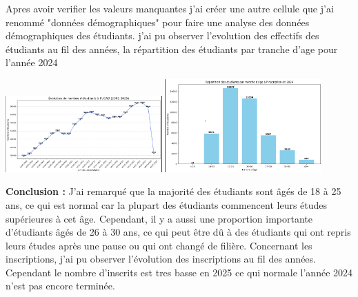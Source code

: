 Apres avoir verifier les valeurs manquantes j'ai créer une autre cellule que j'ai renommé "données démographiques"  pour faire une analyse des données démographiques des étudiants. 
j'ai pu observer l'evolution des effectifs des étudiants au fil des années, la répartition des étudiants par tranche d'age pour l'année 2024  
\begin{center}
    \centering
    \includegraphics[width=0.45\textwidth]{image/4.png}
    \hspace{0.05\textwidth}
    \includegraphics[width=0.45\textwidth]{image/5.png}
\end{center}

\textcolor{red}{\faInfoCircle}\textbf{Conclusion :}  J'ai remarqué que la majorité des étudiants sont âgés de 18 à 25 ans, ce qui est normal car la plupart des étudiants commencent leurs études supérieures à cet âge. Cependant, il y a aussi une proportion importante d'étudiants âgés de 26 à 30 ans, ce qui peut être dû à des étudiants qui ont repris leurs études après une pause ou qui ont changé de filière.
Concernant les inscriptions, j'ai pu observer l'évolution des inscriptions au fil des années. Cependant le nombre d'inscrits est tres basse en 2025 ce qui normale l'année 2024 n'est pas encore terminée. 

